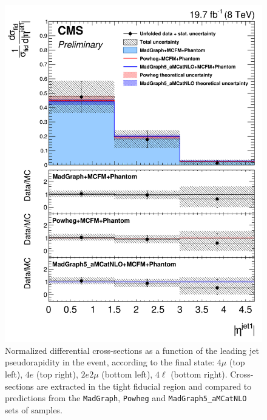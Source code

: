 \begin{figure}[hbtp]
\begin{center}
    \includegraphics[width=\cmsFigWidth]{Figures/DiffCrossSecZZTo4lEtaJet1_Unfolded_fr_MadGraph_norm.png}       
    \caption{\footnotesize{Normalized differential cross-sections as a function of the leading jet pseudorapidity in the event, according to the final state: $4\mu$ (top left), $4e$ (top right), $2e2\mu$  (bottom left),  $4\ell$ (bottom right). Cross-sections are extracted in the tight fiducial region and compared to predictions from the \texttt{MadGraph}, \texttt{Powheg}  and \texttt{MadGraph5\_aMCatNLO} sets of samples.}}
    \label{fig:diff_xs_etajet1}
  \end{center}
\end{figure}

